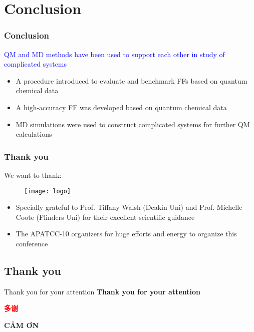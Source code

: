 \documentclass[xcolor=table,aspectratio=169]{beamer}
\begin{document}
\section{Conclusion}

\begin{frame}
	\frametitle{Conclusion}
	\textcolor{blue}{QM and MD methods have been used to support each other in study of complicated systems}
	\begin{itemize}
		\item A procedure introduced to evaluate and benchmark FFs based on quantum chemical data 
		\item A high-accuracy FF was developed based on quantum chemical data
		\item MD simulations were used to construct complicated systems for further QM calculations
	\end{itemize}
\end{frame}


\begin{frame}
	\frametitle{Thank you}
	We want to thank:
	\begin{figure}
		\texttt{[image: logo]}
	\end{figure}
	\begin{itemize}
		\item Specially grateful to Prof. Tiffany Walsh (Deakin Uni) and Prof. Michelle Coote (Flinders Uni) for their excellent scientific guidance
		\item The APATCC-10 organizers for huge efforts and energy to organize this conference
	\end{itemize}
\end{frame}







\subsection*{Thank you}

\begin{frame}{Thank you for your attention}
	\centering
	\textcolor{flinders-blue}{\textbf{\LARGE Thank you for your attention}}\\

	\vspace{0.5cm}

	\begin{CJK*}{UTF8}{zhsong}
		\textcolor{red}{\textbf{\LARGE 多谢}} \clearpage\end{CJK*}

	\textcolor{kul-blue}{\textbf{\LARGE CẢM ƠN}}\\

\end{frame}
\end{document}
